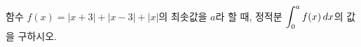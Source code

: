 함수 $f(x)=|x+3|+|x-3|+|x|$의 최솟값을 $a$라 할 때, 정적분 $\displaystyle\int_{0}^{a}f(x)\mkern3mu dx$의 값을 구하시오.
